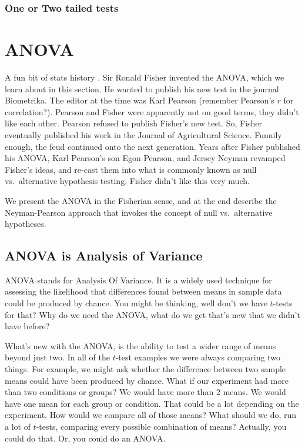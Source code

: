 \documentclass[]{book}
\begin{document}
\hypertarget{one-or-two-tailed-tests}{%
\subsection{One or Two tailed tests}\label{one-or-two-tailed-tests}}

\hypertarget{anova}{%
\chapter{ANOVA}\label{anova}}

A fun bit of stats history \citep{salsburg2001lady}. Sir Ronald Fisher invented the ANOVA, which we learn about in this section. He wanted to publish his new test in the journal Biometrika. The editor at the time was Karl Pearson (remember Pearson's \(r\) for correlation?). Pearson and Fisher were apparently not on good terms, they didn't like each other. Pearson refused to publish Fisher's new test. So, Fisher eventually published his work in the Journal of Agricultural Science. Funnily enough, the feud continued onto the next generation. Years after Fisher published his ANOVA, Karl Pearson's son Egon Pearson, and Jersey Neyman revamped Fisher's ideas, and re-cast them into what is commonly known as null vs.~alternative hypothesis testing. Fisher didn't like this very much.

We present the ANOVA in the Fisherian sense, and at the end describe the Neyman-Pearson approach that invokes the concept of null vs.~alternative hypotheses.

\hypertarget{anova-is-analysis-of-variance}{%
\section{ANOVA is Analysis of Variance}\label{anova-is-analysis-of-variance}}

ANOVA stands for Analysis Of Variance. It is a widely used technique for assessing the likelihood that differences found between means in sample data could be produced by chance. You might be thinking, well don't we have \(t\)-tests for that? Why do we need the ANOVA, what do we get that's new that we didn't have before?

What's new with the ANOVA, is the ability to test a wider range of means beyond just two. In all of the \(t\)-test examples we were always comparing two things. For example, we might ask whether the difference between two sample means could have been produced by chance. What if our experiment had more than two conditions or groups? We would have more than 2 means. We would have one mean for each group or condition. That could be a lot depending on the experiment. How would we compare all of those means? What should we do, run a lot of \(t\)-tests, comparing every possible combination of means? Actually, you could do that. Or, you could do an ANOVA.
\end{document}
